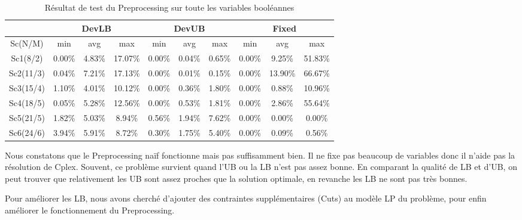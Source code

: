 \bigskip
\begin{table}[h]
    \centering
    \begin{tabular}{|c|c|c|c|c|c|c|c|c|c|}
    	\hline 
    	&\multicolumn{3}{c|}{DevLB}& \multicolumn{3}{c|}{DevUB}& \multicolumn{3}{c|}{Fixed} 	\\ \hline
    	Sc(N/M)	& min & avg & max & min & avg & max & min & avg & max\\ \hline
Sc1(8/2) & 0.00\%  &4.83\%  &17.07\%  &0.00\% & 0.04\%  &0.65\%  &0.00\%  &9.25\% &51.83\% \\ \hline
Sc2(11/3)&  0.04\% & 7.21\% & 17.13\% & 0.00\%&  0.01\% & 0.15\% & 0.00\% &13.90\% & 66.67\%\\ \hline
Sc3(15/4)&  1.10\% & 4.01\% & 10.12\% & 0.00\%&  0.36\% & 1.80\% & 0.00\% &0.88\% & 10.96\%\\ \hline
Sc4(18/5)&  0.05\% & 5.28\% & 12.56\% & 0.00\%&  0.53\% & 1.81\% & 0.00\% &2.86\% & 55.64\%\\ \hline
Sc5(21/5)&  1.82\% & 5.03\% & 8.94\%  &0.56\% & 1.94\%  &7.62\%  &0.00\%  &0.00\% &0.00\%\\ \hline
Sc6(24/6)&  3.94\% & 5.91\% & 8.72\%  &0.30\% & 1.75\%  &5.40\%  &0.00\%  &0.09\% &0.56\%\\ \hline
    \end{tabular}
    \caption{Résultat de test du Preprocessing sur toute les variables booléannes}
    \label{tab_pre}
\end{table}
\bigskip
Nous constatons que le Preprocessing naïf fonctionne mais pas suffisamment bien. Il ne fixe pas beaucoup de variables donc il n'aide pas la résolution de Cplex. Souvent, ce problème survient quand l'UB ou la LB n'est pas assez bonne. En comparant la qualité de LB et d'UB, on peut trouver que relativement les UB sont assez proches que la solution optimale, en revanche les LB ne sont pas très bonnes.

Pour améliorer les LB, nous avons cherché d'ajouter des contraintes supplémentaires (Cuts) au modèle LP du problème, pour enfin améliorer le fonctionnement du Preprocessing.

